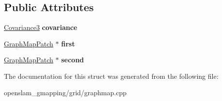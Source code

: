 \subsection*{Public Attributes}
\begin{DoxyCompactItemize}
\item 
\mbox{\label{structGMapping_1_1GraphMapEdge_a4a93e791b0bfb3f1195ee630006c101e}} 
\hyperlink{structGMapping_1_1Covariance3}{Covariance3} {\bfseries covariance}
\item 
\mbox{\label{structGMapping_1_1GraphMapEdge_a774685e8fc6f306e8a737f880dc12a15}} 
\hyperlink{structGMapping_1_1GraphMapPatch}{Graph\+Map\+Patch} $\ast$ {\bfseries first}
\item 
\mbox{\label{structGMapping_1_1GraphMapEdge_af60e2e7e901f1e20f50f488f2b7d578b}} 
\hyperlink{structGMapping_1_1GraphMapPatch}{Graph\+Map\+Patch} $\ast$ {\bfseries second}
\end{DoxyCompactItemize}


The documentation for this struct was generated from the following file\+:\begin{DoxyCompactItemize}
\item 
openslam\+\_\+gmapping/grid/graphmap.\+cpp\end{DoxyCompactItemize}
